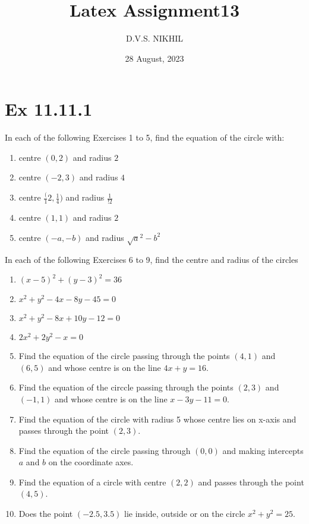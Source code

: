 \documentclass{article}
\theoremstyle{remark}
\begin{document}
\title{Latex Assignment13}
\author{D.V.S. NIKHIL}
\date{28 August, 2023}
\maketitle
\section*{Ex 11.11.1}
In each of the following Exercises 1 to 5, find the equation of the circle with:
\begin{enumerate}[label=\arabic*.,ref=\thesubsection.\theenumi]
\item centre $(0,2)$ and radius $2$
\item centre $(-2,3)$ and radius $4$
\item centre $\frac({1}{2},\frac{1}{4})$ and radius $\frac {1}{!2}$
\item centre $(1,1)$ and radius $2$
\item centre $(-a,-b)$ and radius $\sqrt a^2-b^2$
\end{enumerate}
In each of the following Exercises 6 to 9, find the centre and radius of the circles
\begin{enumerate}[resume]
\item $(x-5)^2+(y-3)^2=36$
\item $x^2+y^2-4x-8y-45=0$
\item $x^2+y^2-8x+10y-12=0$
\item $2x^2+2y^2-x=0$
\item Find the equation of the circle passing through the points $(4,1)$ and $(6,5)$ and whose centre is on the line $4x+y=16$.
\item Find the equation of the circcle passing through the points $(2,3)$ and $(-1,1)$ and whose centre is on the line $x-3y-11=0$.
\item Find the equation of the circle with radius 5 whose centre lies on x-axis and passes through the point $(2,3)$.
\item Find the equation of the circle passing through $(0,0)$ and making intercepts $a$ and $b$ on the coordinate axes.
\item Find the equation of a circle with centre $(2,2)$ and passes through the point $(4,5)$.
\item Does the point $(-2.5,3.5)$ lie inside, outside or on the circle $x^2+y^2=25$.
\end{enumerate}
\end{document}
